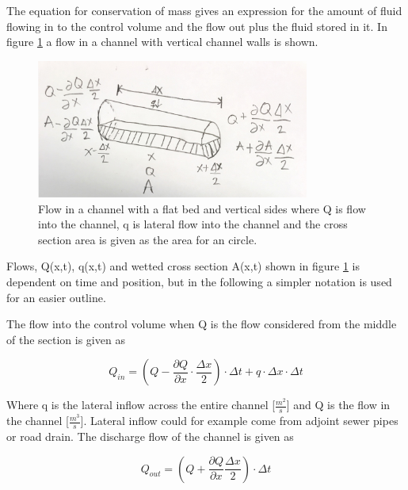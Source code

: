The equation for conservation of mass gives an expression for the amount of fluid flowing in to the control volume and the flow out plus the fluid stored in it.
In figure \ref{fig:firkant_kloak} a flow in a channel with vertical channel walls is shown.

\begin{figure}[H]
\centering
\includegraphics[width=0.8\textwidth]{report/modeling/pictures/continuity_open_channel.jpg}
\caption{Flow in a channel with a flat bed and vertical sides where Q is flow into the channel, q is lateral flow into the channel and the cross section area is given as the area for an circle.}
\label{fig:firkant_kloak}
\end{figure}

Flows, Q(x,t), q(x,t) and wetted cross section A(x,t) shown in figure \ref{fig:firkant_kloak} is dependent on time and position, but in the following a simpler notation is used for an easier outline. 

The flow into the control volume when Q is the flow considered from the middle of the section is given as

\begin{equation}
Q_{in} =	\left(Q - \frac{\partial Q}{\partial x}\cdot \frac{\Delta x}{2}\right) \cdot \Delta t + q \cdot \Delta x \cdot \Delta t
\label{flowin_saintbernard}
\end{equation}

Where q is the lateral inflow across the entire channel [$\frac{m^2}{s}$] and Q is the flow in the channel [$\frac{m^3}{s}$]. Lateral inflow could for example come from adjoint sewer pipes or road drain.
The discharge flow of the channel is given as

\begin{equation}
Q_{out} =\left(Q + \frac{\partial Q}{ \partial x} \frac{\Delta x}{2} \right) \cdot \Delta t 
\label{flowout_saintbernard}
\end{equation}

